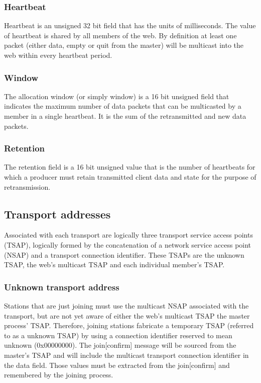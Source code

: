 \documentclass[11pt]{article}
\begin{document}
\hypertarget{heartbeat}{\subsubsection{Heartbeat}}

   Heartbeat is an unsigned 32 bit field that has the units of
   milliseconds. The value of heartbeat is shared by all members of the
   web. By definition at least one packet (either data, empty or quit
   from the master) will be multicast into the web within every
   heartbeat period.

\hypertarget{window}{\subsubsection{Window}}

   The allocation window (or simply window) is a 16 bit unsigned field
   that indicates the maximum number of data packets that can be
   multicasted by a member in a single heartbeat. It is the sum of the
   retransmitted and new data packets.

\hypertarget{retention}{\subsubsection{Retention}}

   The retention field is a 16 bit unsigned value that is the number of
   heartbeats for which a producer must retain transmitted client data
   and state for the purpose of retransmission.

\subsection{Transport addresses}

   Associated with each transport are logically three transport service
   access points (TSAP), logically formed by the concatenation of a
   network service access point (NSAP) and a transport connection
   identifier. These TSAPs are the unknown TSAP, the web's multicast
   TSAP and each individual member's TSAP.

\subsubsection{Unknown transport address}

   Stations that are just joining must use the multicast NSAP associated
   with the transport, but are not yet aware of either the web's
   multicast TSAP the master process' TSAP\@. Therefore, joining stations
   fabricate a temporary TSAP (referred to as a unknown TSAP) by using a
   connection identifier reserved to mean unknown (0x00000000). The
   join[confirm] message will be sourced from the master's TSAP and will
   include the multicast transport connection identifier in the data
   field. Those values must be extracted from the join[confirm] and
   remembered by the joining process.
\end{document}
